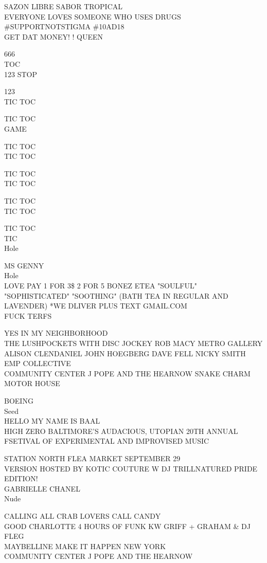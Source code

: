 \documentclass[10pt,letterpaper]{article}
\begin{document}
SAZON LIBRE SABOR TROPICAL\\
EVERYONE LOVES SOMEONE WHO USES DRUGS \#SUPPORTNOTSTIGMA \#10AD18\\
GET DAT MONEY! ! QUEEN

666\\
TOC\\
123 STOP

123\\
TIC TOC

TIC TOC\\
GAME

TIC TOC\\
TIC TOC

TIC TOC\\
TIC TOC

TIC TOC\\
TIC TOC

TIC TOC\\
TIC\\
Hole

MS GENNY\\
Hole\\
LOVE PAY 1 FOR 3\$ 2 FOR 5 BONEZ ETEA "SOULFUL" "SOPHISTICATED" "SOOTHING" (BATH TEA IN REGULAR AND LAVENDER) *WE DLIVER PLUS TEXT GMAIL.COM\\
FUCK TERFS

YES IN MY NEIGHBORHOOD\\
THE LUSHPOCKETS WITH DISC JOCKEY ROB MACY METRO GALLERY\\
ALISON CLENDANIEL JOHN HOEGBERG DAVE FELL NICKY SMITH EMP COLLECTIVE\\
COMMUNITY CENTER J POPE AND THE HEARNOW SNAKE CHARM MOTOR HOUSE

BOEING\\
Seed\\
HELLO MY NAME IS BAAL\\
HIGH ZERO BALTIMORE'S AUDACIOUS, UTOPIAN 20TH ANNUAL FSETIVAL OF EXPERIMENTAL AND IMPROVISED MUSIC

STATION NORTH FLEA MARKET SEPTEMBER 29\\
VERSION HOSTED BY KOTIC COUTURE W DJ TRILLNATURED PRIDE EDITION!\\
GABRIELLE CHANEL\\
Nude

CALLING ALL CRAB LOVERS CALL CANDY\\
GOOD CHARLOTTE 4 HOURS OF FUNK KW GRIFF + GRAHAM \& DJ FLEG\\
MAYBELLINE MAKE IT HAPPEN NEW YORK\\
COMMUNITY CENTER J POPE AND THE HEARNOW
\end{document}
